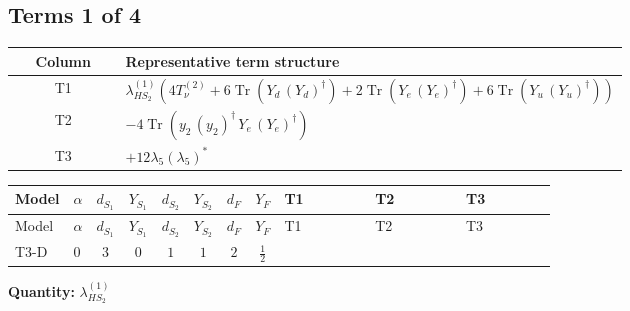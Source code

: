 \documentclass[8pt]{article}
\begin{document}
\begin{landscape}
\subsection*{Terms 1 of 4}
\begin{center}
\begin{tabular}{@{}c >{\raggedright\arraybackslash}p{0.82\linewidth}@{}}
\toprule
Column & Representative term structure \\
\midrule
T1 & \(\displaystyle {\lambda_{HS_2}^{(1)}} (4 T_{\nu}^{(2)}+6 \operatorname{Tr}\!\left({Y_d}\,\left({Y_d}\right)^{\dagger}\right)+2 \operatorname{Tr}\!\left({Y_e}\,\left({Y_e}\right)^{\dagger}\right)+6 \operatorname{Tr}\!\left({Y_u}\,\left({Y_u}\right)^{\dagger}\right))\) \\
\midrule
T2 & \(\displaystyle -4 \operatorname{Tr}\!\left({y_2}\,\left({y_2}\right)^{\dagger}\,{Y_e}\,\left({Y_e}\right)^{\dagger}\right)\) \\
\midrule
T3 & \(\displaystyle +12 {\lambda_5} \left({\lambda_5}\right)^{*}\) \\
\midrule
\bottomrule
\end{tabular}
\end{center}
\smallskip
\tiny
\begin{longtable}{@{}llcccccc >{\raggedright\arraybackslash}p{0.21\linewidth} >{\raggedright\arraybackslash}p{0.21\linewidth} >{\raggedright\arraybackslash}p{0.21\linewidth}@{}}
\toprule
Model & $\alpha$ & $d_{S_1}$ & $Y_{S_1}$ & $d_{S_2}$ & $Y_{S_2}$ & $d_F$ & $Y_F$ & T1 & T2 & T3 \\
\midrule
\endfirsthead
\toprule
Model & $\alpha$ & $d_{S_1}$ & $Y_{S_1}$ & $d_{S_2}$ & $Y_{S_2}$ & $d_F$ & $Y_F$ & T1 & T2 & T3 \\
\midrule
\endhead
T3-D & $0$ & $3$ & $0$ & $1$ & $1$ & $2$ & $\frac{1}{2}$ & \scriptsize\adjustbox{max width=\linewidth}{$\begin{gathered} {\lambda_{HS_2}^{(1)}} (4 T_{\nu}^{(2)}+6 \operatorname{Tr}\!\left({Y_d}\,\left({Y_d}\right)^{\dagger}\right)+2 \operatorname{Tr}\!\left({Y_e}\,\left({Y_e}\right)^{\dagger}\right)+6 \operatorname{Tr}\!\left({Y_u}\,\left({Y_u}\right)^{\dagger}\right))\end{gathered}$} & \scriptsize\adjustbox{max width=\linewidth}{$\begin{gathered} -4 \operatorname{Tr}\!\left({y_2}\,\left({y_2}\right)^{\dagger}\,{Y_e}\,\left({Y_e}\right)^{\dagger}\right)\end{gathered}$} & \scriptsize\adjustbox{max width=\linewidth}{$\begin{gathered} +12 {\lambda_5} \left({\lambda_5}\right)^{*}\end{gathered}$} \\
\midrule
\bottomrule
\end{longtable}
\clearpage
\noindent\textbf{Quantity: }$\lambda_{HS_2}^{(1)}$\par\smallskip

\end{landscape}
\end{document}
